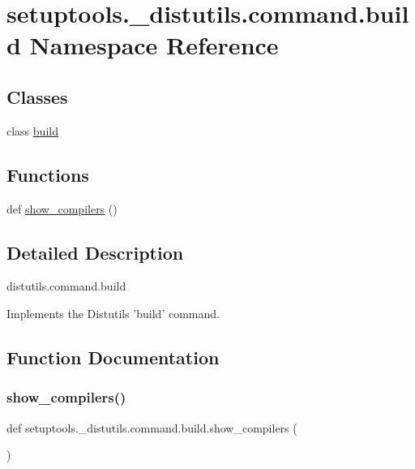 \hypertarget{namespacesetuptools_1_1__distutils_1_1command_1_1build}{}\section{setuptools.\+\_\+distutils.\+command.\+build Namespace Reference}
\label{namespacesetuptools_1_1__distutils_1_1command_1_1build}
\subsection*{Classes}
\begin{DoxyCompactItemize}
\item 
class \hyperlink{classsetuptools_1_1__distutils_1_1command_1_1build_1_1build}{build}
\end{DoxyCompactItemize}
\subsection*{Functions}
\begin{DoxyCompactItemize}
\item 
def \hyperlink{namespacesetuptools_1_1__distutils_1_1command_1_1build_ac676e844ac6e2c6447b94be26a5c42f5}{show\+\_\+compilers} ()
\end{DoxyCompactItemize}


\subsection{Detailed Description}
\begin{DoxyVerb}distutils.command.build

Implements the Distutils 'build' command.\end{DoxyVerb}
 

\subsection{Function Documentation}
\mbox{\label{namespacesetuptools_1_1__distutils_1_1command_1_1build_ac676e844ac6e2c6447b94be26a5c42f5}} 
\subsubsection{\texorpdfstring{show\+\_\+compilers()}{show\_compilers()}}
{\footnotesize\ttfamily def setuptools.\+\_\+distutils.\+command.\+build.\+show\+\_\+compilers (\begin{DoxyParamCaption}{ }\end{DoxyParamCaption})}

